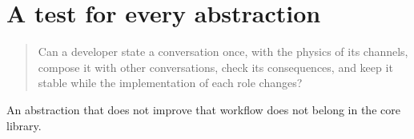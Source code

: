 \section{A test for every abstraction}

\begin{quote}
Can a developer state a conversation once, with the physics of its channels,
compose it with other conversations, check its consequences, and keep it stable
while the implementation of each role changes?
\end{quote}

An abstraction that does not improve that workflow does not belong in the core
library.
